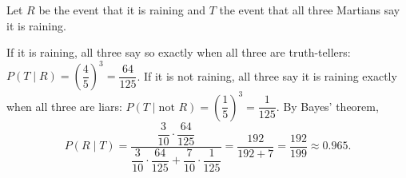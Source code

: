 Let $R$ be the event that it is raining and $T$ the event that all three Martians say it is raining.

If it is raining, all three say so exactly when all three are truth-tellers: $P(T\mid R)=\left(\dfrac{4}{5}\right)^3=\dfrac{64}{125}$. If it is not raining, all three say it is raining exactly when all three are liars: $P(T\mid \text{not }R)=\left(\dfrac{1}{5}\right)^3=\dfrac{1}{125}$. By Bayes' theorem,
\[P(R\mid T)=\dfrac{\dfrac{3}{10}\cdot\dfrac{64}{125}}{\dfrac{3}{10}\cdot\dfrac{64}{125}+\dfrac{7}{10}\cdot\dfrac{1}{125}}=\dfrac{192}{192+7}=\boxed{\dfrac{192}{199}}\approx0.965 .\]
